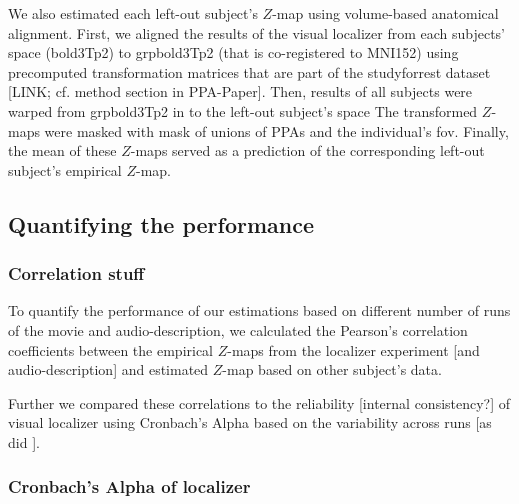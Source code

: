 
%
We also estimated each left-out subject's $Z$-map using volume-based anatomical
alignment.
First, we aligned the results of the visual localizer from each subjects' space
(bold3Tp2) to grpbold3Tp2 (that is co-registered to MNI152) using precomputed
transformation matrices that are part of the studyforrest dataset [LINK; cf.
method section in PPA-Paper].
Then, results of all subjects were warped from grpbold3Tp2 in to the left-out
subject's space
%
The transformed $Z$-maps were masked with mask of unions of PPAs and the
individual's \ac{fov}.
%
Finally, the mean of these $Z$-maps served as a prediction of the corresponding
left-out subject's empirical $Z$-map.


\subsection{Quantifying the performance}


\subsubsection{Correlation stuff}

%
To quantify the performance of our estimations based on different number of runs
of the movie and audio-description, we calculated the Pearson's correlation
coefficients between the empirical $Z$-maps from the localizer experiment [and
audio-description] and estimated $Z$-map based on other subject's data.

%
Further we compared these correlations to the reliability [internal
consistency?] of visual localizer using Cronbach's Alpha based on the
variability across runs [as did
\citep{jiahui2020predicting}].


\subsubsection{Cronbach's Alpha of localizer}






